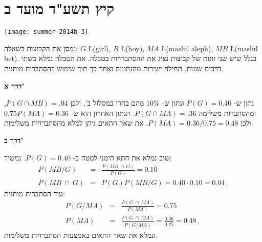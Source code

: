 

\section{קיץ תשע"ד מועד ב}

\begin{center}
\texttt{[image: summer-2014b-3]}
\end{center}

נמסן את הקבוצות בשאלה:
$G$ \L{(girl)}, $B$ \L{(boy)},
$MA$ \L{(maslul aleph)}, $MB$ \L{(maslul bet)}.
בגלל שיש שני זוגות של קבוצות נציג את ההסתברויות בטבלה. את הטבלה נמלא בשתי דרכים שונות, תחילה ישירות מהנתונים ואחר כך תוך שימוש בהסתברות מותנית.
\begin{center}
\end{center}

\textbf{דרך א'}

נתון ש-%
$P(G)=0.40$
ונתון ש-%
$10\%$
מהם בחרו במסלול ב', ולכן 
$P(G\cap MB)= .04$,
ומהסתברות משלימה
$P(G\cap MA)= .36$.
הנתון האחרון הוא ש-%
$0.75 P(MA) = 0.36$
ולכן 
$P(MA)=0.36/0.75=0.48$.
את שאר התאים ניתן למלא מהסתברויות משלימות.

\textbf{דרך ב'}

שוב נמלא את התא הימני למטה ב-%
$P(G)=0.40$.
נמשיך:
\begin{eqnarray*}
P(MB/G) &=& \frac{P(MB \:\cap\: G)}{P(G)}=0.10\\
P(MB \:\cap\: G) &=& P(G)P(MB/G) = 0.40\cdot 0.10 = 0.04\,.
\end{eqnarray*}
עוד הסתברות מותנית:
\begin{eqnarray*}
P(G/MA) &=& \frac{P(G \:\cap\: MA)}{P(MA)}=0.75\\
P(MA) &=& \frac{P(G \:\cap\: MA)}{P(G/MA)}=\frac{0.36}{0.75}=0.48\,,
\end{eqnarray*}
ונמלא את שאר התאים באמצעות הסתברויות משלימות.

